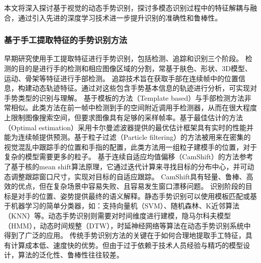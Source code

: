 本文将深入探讨基于视觉的动态手势识别，探讨多模态识别过程中的特征解耦与融合，通过引入先进的深度学习技术进一步提升识别的准确性和鲁棒性。

\subsubsection{基于手工提取特征的手势识别方法}
早期研究使用手工提取特征进行手势识别，包括检测、追踪和识别三个阶段\cite{rautaray2015vision}。
检测的目的是进行手的检测和相应图像区域的分割，常基于肤色\cite{sigal2004skin}、形状\cite{chen2007real}、3D模型\cite{tekin2019h+}、运动\cite{pun2011real}、骨架\cite{jiang2021chal21}等特征进行手部检测。
追踪技术旨在获取手部在连续帧中的位置信息，构建动态轨迹特征。通过对这些包含手势基本信息的轨迹进行分析，可实现对手势类型的识别与理解。
基于模板的方法（Template based）\cite{crowley1995finger}与手部检测方法非常相似。此类方法在前一帧中检测到手的空间附近调用手检测器，从而在很大程度上限制图像搜索空间，但要求图像具有足够的采样帧率。基于最佳估计的方法（Optimal estimation）\cite{argyros2004real}采用卡尔曼滤波器\cite{kalman1960new}提供的最优估计框架具有实时的性能并能为连续帧提供预测。基于粒子过滤（Particle filtering）的方法\cite{perez2002color}被用来在密集的视觉混乱中跟踪手的位置和手指的配置，此类方法用一组粒子建模手的位置，对于复杂的模型需要更多的粒子。
基于连续自适应均值偏移（CamShift）的方法\cite{wang2010study}参考了基于核的mean shift算法原理，它通过迭代计算来寻找目标的分布中心，并可动态调整跟踪窗口尺寸，实现对目标的自适应跟踪。
CamShift具有轻量、鲁棒、高效的优点，但在复杂场景中容易失败、且容易发生窗口漂移问题。
识别阶段的目标是对手的位置、姿势提供最终的语义解释。静态手势识别可以使用模板匹配或基于机器学习的简单分类器\cite{基于视觉的动态手势识别研究综述}，如：支持向量机（SVM）\cite{burges1998tutorial}、随机森林\cite{基于视觉的动态手势识别研究综述}、K近邻算法（KNN）\cite{thirumuruganathan2010knn}等。动态手势识别则需要对时间维度进行建模，隐马尔科夫模型（HMM）\cite{liang1996sign}，动态时间规整（DTW）\cite{corradini2001dynamic}，时延神经网络\cite{sigal2004skin}等算法在动态手势识别系统中得到了广泛的应用。
传统手势识别方法的关键在于如何合理地提取手工特征，具有计算成本低、速度快的优势。但由于过于依赖于技术人员经验与精巧的模型设计，算法的泛化性、鲁棒性往往较差。

